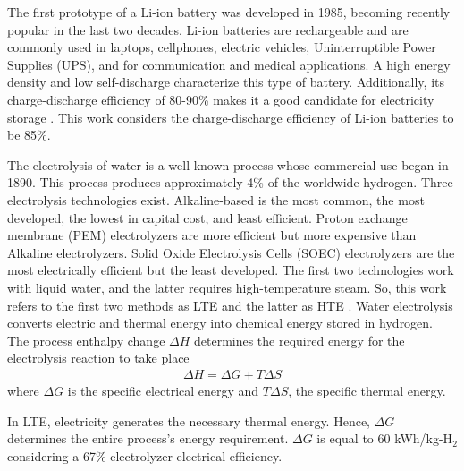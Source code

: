\documentclass{anstrans}
\begin{document}
The first prototype of a Li-ion battery was developed in 1985, becoming recently popular in the last two decades.
Li-ion batteries are rechargeable and are commonly used in laptops, cellphones, electric vehicles, Uninterruptible Power Supplies (UPS), and for communication and medical applications.
A high energy density and low self-discharge characterize this type of battery.
Additionally, its charge-discharge efficiency of 80-90\% makes it a good candidate for electricity storage \cite{sun_car_2010}.
This work considers the charge-discharge efficiency of Li-ion batteries to be 85\%.

The electrolysis of water is a well-known process whose commercial use began in 1890.
This process produces approximately 4\% of the worldwide hydrogen.
Three electrolysis technologies exist.
Alkaline-based is the most common, the most developed, the lowest in capital cost, and least efficient.
Proton exchange membrane (PEM) electrolyzers are more efficient but more expensive than Alkaline electrolyzers.
Solid Oxide Electrolysis Cells (SOEC) electrolyzers are the most electrically efficient but the least developed.
The first two technologies work with liquid water, and the latter requires high-temperature steam.
So, this work refers to the first two methods as \gls{LTE} and the latter as \gls{HTE} \cite{fairhurst-agosta_multi-physics_2020}.
Water electrolysis converts electric and thermal energy into chemical energy stored in hydrogen.
The process enthalpy change $\Delta H$ determines the required energy for the electrolysis reaction to take place
\begin{align}
  \Delta H = \Delta G + T \Delta S
\end{align}
where $\Delta G$ is the specific electrical energy and $T \Delta S$, the specific thermal energy.

In LTE, electricity generates the necessary thermal energy.
Hence, $\Delta G$ determines the entire process’s energy requirement.
$\Delta G$ is equal to 60 kWh/kg-H$_2$ considering a 67\% electrolyzer electrical efficiency.
\end{document}
